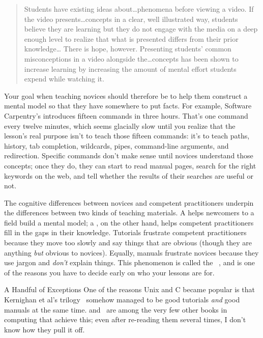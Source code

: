 \begin{quote}

  Students have existing ideas about{\ldots}phenomena before viewing a video.
  If the video presents{\ldots}concepts in a clear, well illustrated way,
  students believe they are learning but they do not engage with the media on a deep enough level
  to realize that what is presented differs from their prior knowledge{\ldots}
  There is hope, however.
  Presenting students' common misconceptions in a video alongside the{\ldots}concepts
  has been shown to increase learning
  by increasing the amount of mental effort students expend while watching it.

\end{quote}

Your goal when teaching novices should therefore be
to help them construct a mental model
so that they have somewhere to put facts.
For example,
Software Carpentry's
introduces fifteen commands in three hours.
That's one command every twelve minutes,
which seems glacially slow until you realize that
the lesson's real purpose isn't to teach those fifteen commands:
it's to teach paths,
history,
tab completion,
wildcards,
pipes,
command-line arguments,
and redirection.
Specific commands don't make sense until novices understand those concepts;
once they do,
they can start to read manual pages,
search for the right keywords on the web,
and tell whether the results of their searches are useful or not.

The cognitive differences between novices and competent practitioners
underpin the differences between two kinds of teaching materials.
A  helps newcomers to a field build a mental model;
a ,
on the other hand,
helps competent practitioners fill in the gaps in their knowledge.
Tutorials frustrate competent practitioners because they move too slowly
and say things that are obvious
(though they are anything \emph{but} obvious to novices).
Equally,
manuals frustrate novices because they use jargon and \emph{don't} explain things.
This phenomenon is called the ~\cite{Kaly2003},
and is one of the reasons you have to decide early on
who your lessons are for.

\begin{aside}{A Handful of Exceptions}
  One of the reasons Unix and C became popular is that
  Kernighan et al's trilogy~\cite{Kern1978,Kern1983,Kern1988}
  somehow managed to be good tutorials \emph{and} good manuals at the same time.
  \cite{Fehi2008} and~\cite{Ray2014} are among the very few other books in computing that achieve this;
  even after re-reading them several times,
  I don't know how they pull it off.
\end{aside}

